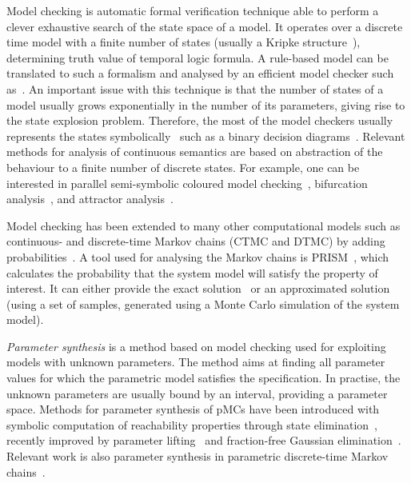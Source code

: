 \documentclass[11pt,a4paper]{report}
\begin{document}
Model checking is automatic formal verification technique able to perform a clever exhaustive search of the state space of a model. It operates over a discrete time model with a finite number of states (usually a Kripke structure~\cite{kripke1963semantical}), determining truth value of temporal logic formula. A rule-based model can be translated to such a formalism and analysed by an efficient model checker such as~\cite{cimatti2002nusmv}. An important issue with this technique is that the number of states of a model usually grows exponentially in the number of its parameters, giving rise to the state explosion problem. Therefore, the most of the model checkers usually represents the states symbolically~\cite{burch1992symbolic} such as a binary decision diagrams~\cite{bryant2001graph}. Relevant methods for analysis of continuous semantics are based on abstraction of the behaviour to a finite number of discrete states. For example, one can be interested in parallel semi-symbolic coloured model checking~\cite{benevs2016model}, bifurcation analysis~\cite{benevs2017discrete}, and attractor analysis~\cite{benevs2018fully}. 

Model checking has been extended to many other computational models such as continuous- and discrete-time Markov chains (CTMC and DTMC) by adding probabilities~\cite{kwiatkowska2010probabilistic}. A tool used for analysing the Markov chains is PRISM~\cite{kwiatkowska2011prism}, which calculates the probability that the system model will satisfy the property of interest. It can either provide the exact solution~\cite{aziz2000model} or an approximated solution~\cite{jha2009bayesian} (using a set of samples, generated using a Monte Carlo simulation of the system model).

\emph{Parameter synthesis} is a method based on model checking used for exploiting models with unknown parameters. The method aims at finding all parameter values for which the parametric model satisfies the specification. In practise, the unknown parameters are usually bound by an interval, providing a parameter space. Methods for parameter synthesis of pMCs have been introduced with symbolic computation of reachability properties through state elimination~\cite{daws2004symbolic,jansen2014accelerating,hahn2011probabilistic}, recently improved by parameter lifting~\cite{quatmann2016parameter} and fraction-free Gaussian elimination~\cite{hutschenreiter2017parametric}. Relevant work is also parameter synthesis in parametric discrete-time Markov chains~\cite{daws2004symbolic}.
\end{document}
